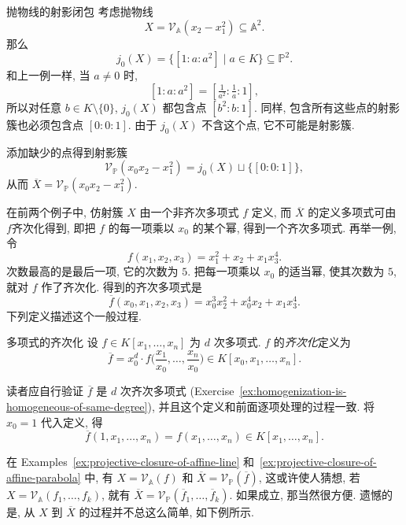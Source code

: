 \begin{Example}{抛物线的射影闭包}\leavevmode\label{ex:projective-closure-of-affine-parabola}
考虑抛物线
\[
  X=\mathcal{V}_{\mathbb{A}}(x_{2}-x_{1}^{2})\subseteq\mathbb{A}^{2}.
\]
那么
\[
  j_{0}(X)=\{[1:a:a^{2}]\mid a\in K\}\subseteq\mathbb{P}^{2}.
\]
和上一例一样, 当 $a\neq0$ 时,
\[
  [1:a:a^{2}]=[\tfrac{1}{a^{2}}:\tfrac{1}{a}:1],
\]
所以对任意 $b\in K\setminus\{0\}$, $j_{0}(X)$ 都包含点 $[b^{2}:b:1]$. 同样, 包含所有这些点的射影簇也必须包含点 $[0:0:1]$. 由于 $j_{0}(X)$ 不含这个点, 它不可能是射影簇.

添加缺少的点得到射影簇
\[
  \mathcal{V}_{\mathbb{P}}(x_{0}x_{2}-x_{1}^{2})=j_{0}(X)\sqcup\{[0:0:1]\},
\]
从而 $\overline{X}=\mathcal{V}_{\mathbb{P}}(x_{0}x_{2}-x_{1}^{2})$.
\end{Example}

在前两个例子中, 仿射簇 $X$ 由一个非齐次多项式 $f$ 定义, 而 $\overline{X}$ 的定义多项式可由 $f$\textquotedbl{}齐次化\textquotedbl{}得到, 即把 $f$ 的每一项乘以 $x_{0}$ 的某个幂, 得到一个齐次多项式. 再举一例, 令
\[
  f(x_{1},x_{2},x_{3})=x_{1}^{2}+x_{2}+x_{1}x_{3}^{4}.
\]
次数最高的是最后一项, 它的次数为 $5$. 把每一项乘以 $x_{0}$ 的适当幂, 使其次数为 $5$, 就对 $f$ 作了齐次化. 得到的齐次多项式是
\[
  \overline{f}(x_{0},x_{1},x_{2},x_{3})=x_{0}^{3}x_{2}^{2}+x_{0}^{4}x_{2}+x_{1}x_{3}^{4}.
\]
下列定义描述这个一般过程.

\begin{Definition}{多项式的齐次化}\leavevmode\label{def:homogenization-of-polynomial}
设 $f\in K[x_{1},\ldots,x_{n}]$ 为 $d$ 次多项式. $f$ 的\emph{齐次化}定义为
\[
  \overline{f}=x_{0}^{d}\cdot f\biggl(\frac{x_{1}}{x_{0}},\ldots,\frac{x_{n}}{x_{0}}\biggr)
  \in K[x_{0},x_{1},\ldots,x_{n}].
\]
\end{Definition}

读者应自行验证 $\overline{f}$ 是 $d$ 次齐次多项式 (Exercise~\ref{ex:homogenization-is-homogeneous-of-same-degree}), 并且这个定义和前面逐项处理的过程一致. 将 $x_{0}=1$ 代入定义, 得
\begin{equation}\label{eq:dehomogenize-by-setting-first-coordinate-one}
  \overline{f}(1,x_{1},\ldots,x_{n})=f(x_{1},\ldots,x_{n})\in K[x_{1},\ldots,x_{n}].
\end{equation}

在 Examples~\ref{ex:projective-closure-of-affine-line} 和~\ref{ex:projective-closure-of-affine-parabola} 中, 有 $X=\mathcal{V}_{\mathbb{A}}(f)$ 和 $\overline{X}=\mathcal{V}_{\mathbb{P}}(\overline{f})$, 这或许使人猜想, 若 $X=\mathcal{V}_{\mathbb{A}}(f_{1},\ldots,f_{k})$, 就有 $\overline{X}=\mathcal{V}_{\mathbb{P}}(\overline{f}_{1},\ldots,\overline{f}_{k})$. 如果成立, 那当然很方便. 遗憾的是, 从 $X$ 到 $\overline{X}$ 的过程并不总这么简单, 如下例所示.

